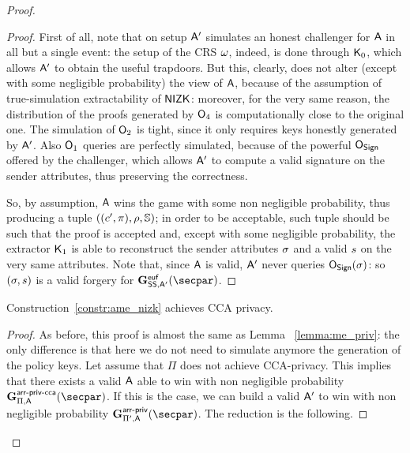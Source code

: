 \begin{theorem}
\begin{proof}
\begin{lemma}
\begin{proof}
                First of all, note that on setup $\mathsf{A}'$ simulates an honest challenger for $\mathsf{A}$ in all but a single event: the setup of the CRS $\omega$, indeed, is done through $\mathsf{K}_0$, which allows $\mathsf{A}'$ to obtain the useful trapdoors. But this, clearly, does not alter (except with some negligible probability) the view of $\mathsf{A}$, because of the assumption of true-simulation extractability of $\mathsf{NIZK}$: moreover, for the very same reason, the distribution of the proofs generated by $\mathsf{O}_4$ is computationally close to the original one.
                The simulation of $\mathsf{O}_2$ is tight, since it only requires keys honestly generated by $\mathsf{A}'$.
                Also $\mathsf{O}_1$ queries are perfectly simulated, because of the powerful $\mathsf{O}_{\mathsf{Sign}}$ offered by the challenger, which allows $\mathsf{A}'$ to compute a valid signature on the sender attributes, thus preserving the correctness.

                So, by assumption, $\mathsf{A}$ wins the game with some non negligible probability, thus producing a tuple $((c', \pi), \rho, \mathbb{S})$; in order to be acceptable, such tuple should be such that the proof is accepted and, except with some negligible probability, the extractor $\mathsf{K}_1$ is able to reconstruct the sender attributes $\sigma$ and a valid $s$ on the very same attributes.
                Note that, since $\mathsf{A}$ is valid, $\mathsf{A}'$ never queries $\mathsf{O}_{\mathsf{Sign}}(\sigma)$: so $(\sigma, s)$ is a valid forgery for $\Sigeufgame_{\sig, \adversary'}(\secpar)$.
            \end{proof}
        \end{lemma}

        \begin{lemma}\label{lemma:ame_priv}
            Construction~\ref{constr:ame_nizk} achieves CCA privacy.
            \begin{proof}
                As before, this proof is almost the same as Lemma ~\ref{lemma:me_priv}: the only difference is that here we do not need to simulate anymore the generation of the policy keys.
                Let assume that $\Pi$ does not achieve CCA-privacy. This implies that there exists a valid $\mathsf{A}$ able to win with non negligible probability $\NISHmatchgamecca{\arranged}_{\Pi, \adversary}(\secpar)$. If this is the case, we can build a valid $\mathsf{A}'$ to win with non negligible probability $\NISHmatchgame{\arranged}_{\Pi', \adversary}(\secpar)$. The reduction is the following.


\end{proof}
\end{lemma}
\end{proof}
\end{theorem}
